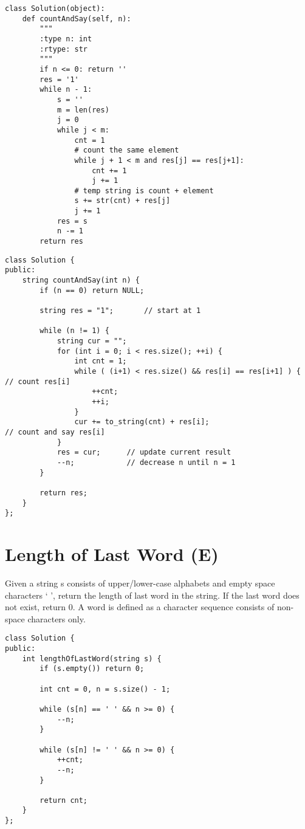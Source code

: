 \begin{lstlisting}
class Solution(object):
    def countAndSay(self, n):
        """
        :type n: int
        :rtype: str
        """
        if n <= 0: return ''
        res = '1'
        while n - 1:
            s = ''
            m = len(res)
            j = 0
            while j < m:
                cnt = 1
                # count the same element 
                while j + 1 < m and res[j] == res[j+1]:
                    cnt += 1
                    j += 1
                # temp string is count + element
                s += str(cnt) + res[j]
                j += 1
            res = s
            n -= 1
        return res
\end{lstlisting}

\begin{lstlisting}
class Solution {
public:
    string countAndSay(int n) {
        if (n == 0) return NULL;
        
        string res = "1";       // start at 1
        
        while (n != 1) {
            string cur = "";
            for (int i = 0; i < res.size(); ++i) {
                int cnt = 1;
                while ( (i+1) < res.size() && res[i] == res[i+1] ) {        // count res[i]
                    ++cnt;
                    ++i;
                }
                cur += to_string(cnt) + res[i];                             // count and say res[i]
            }
            res = cur;      // update current result
            --n;            // decrease n until n = 1
        }
        
        return res;
    }
};
\end{lstlisting}


\section{Length of Last Word (E)}
Given a string s consists of upper/lower-case alphabets and empty space characters ` ', return the length of last word in the string. If the last word does not exist, return 0. A word is defined as a character sequence consists of non-space characters only. \\

\begin{lstlisting}
class Solution {
public:
    int lengthOfLastWord(string s) {
        if (s.empty()) return 0;
        
        int cnt = 0, n = s.size() - 1;
        
        while (s[n] == ' ' && n >= 0) {
            --n;
        }
        
        while (s[n] != ' ' && n >= 0) {
            ++cnt;
            --n;
        }
        
        return cnt;
    }
};
\end{lstlisting}


